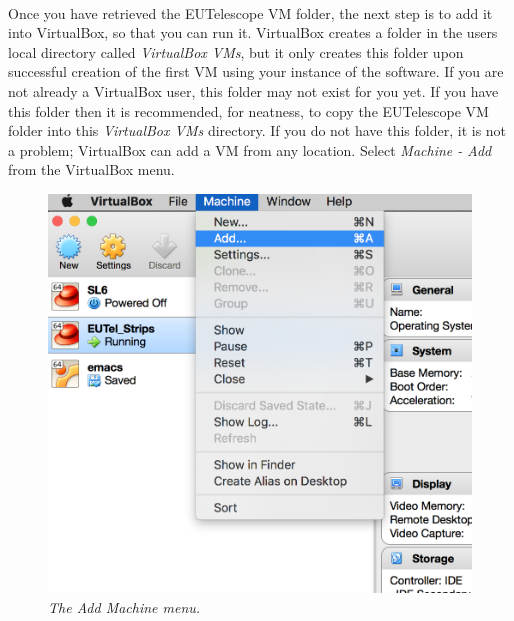 \documentclass[11pt]{article}
\begin{document}
\paragraph{}
Once you have retrieved the EUTelescope VM folder, the next step is to add it into VirtualBox, so that you can run it. VirtualBox creates a folder in the users local directory called \textit{VirtualBox VMs}, but it only creates this folder upon successful creation of the first VM using your instance of the software. If you are not already a VirtualBox user, this folder may not exist for you yet. If you have this folder then it is recommended, for neatness, to copy the EUTelescope VM folder into this \textit{VirtualBox VMs} directory. If you do not have this folder, it is not a problem; VirtualBox can add a VM from any location. Select \textit{Machine - Add} from the VirtualBox menu.
\begin{figure}[!ht]
	\centering
	\includegraphics[scale=0.3]{addmachine.png}
	\caption{\textit{The Add Machine menu.}}
\end{figure}
\end{document}
